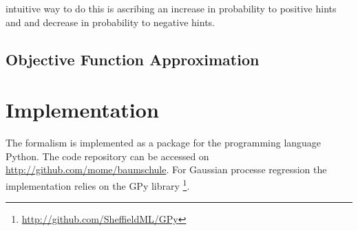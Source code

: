 \documentclass[english]{article}
\begin{document}
intuitive way to do this is ascribing an increase in probability to positive hints and and decrease in probability to negative hints.


\subsection{Objective Function Approximation}


\section{Implementation}
The formalism is implemented as a package for the programming language Python. The code repository can be accessed on \url{http://github.com/mome/baumschule}. For Gaussian processe regression the implementation relies on the GPy library \footnote{\url{http://github.com/SheffieldML/GPy}}.
\end{document}
